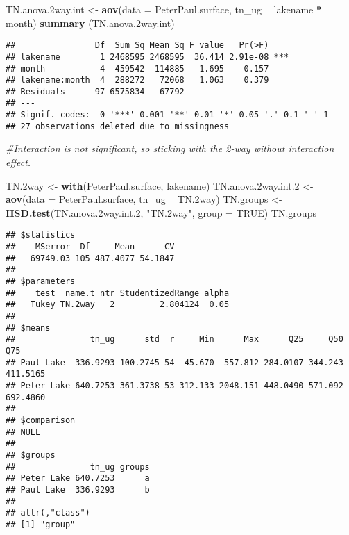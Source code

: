 \documentclass[]{article}
\newenvironment{Shaded}{\begin{snugshade}}{\end{snugshade}}
\newcommand{\CommentTok}[1]{\textcolor[rgb]{0.56,0.35,0.01}{\textit{#1}}}
\newcommand{\DataTypeTok}[1]{\textcolor[rgb]{0.13,0.29,0.53}{#1}}
\newcommand{\FloatTok}[1]{\textcolor[rgb]{0.00,0.00,0.81}{#1}}
\newcommand{\KeywordTok}[1]{\textcolor[rgb]{0.13,0.29,0.53}{\textbf{#1}}}
\newcommand{\NormalTok}[1]{#1}
\newcommand{\OperatorTok}[1]{\textcolor[rgb]{0.81,0.36,0.00}{\textbf{#1}}}
\newcommand{\OtherTok}[1]{\textcolor[rgb]{0.56,0.35,0.01}{#1}}
\newcommand{\StringTok}[1]{\textcolor[rgb]{0.31,0.60,0.02}{#1}}
\begin{document}
\begin{Shaded}
\begin{Highlighting}[]
\NormalTok{TN.anova}\FloatTok{.2}\NormalTok{way.int <-}\StringTok{ }\KeywordTok{aov}\NormalTok{(}\DataTypeTok{data =}\NormalTok{ PeterPaul.surface, tn_ug }\OperatorTok{~}\StringTok{ }\NormalTok{lakename }\OperatorTok{*}\StringTok{ }\NormalTok{month)}
\KeywordTok{summary}\NormalTok{ (TN.anova}\FloatTok{.2}\NormalTok{way.int)}
\end{Highlighting}
\end{Shaded}

\begin{verbatim}
##                Df  Sum Sq Mean Sq F value   Pr(>F)    
## lakename        1 2468595 2468595  36.414 2.91e-08 ***
## month           4  459542  114885   1.695    0.157    
## lakename:month  4  288272   72068   1.063    0.379    
## Residuals      97 6575834   67792                     
## ---
## Signif. codes:  0 '***' 0.001 '**' 0.01 '*' 0.05 '.' 0.1 ' ' 1
## 27 observations deleted due to missingness
\end{verbatim}

\begin{Shaded}
\begin{Highlighting}[]
\CommentTok{#Interaction is not significant, so sticking with the 2-way without interaction effect.}

\NormalTok{TN}\FloatTok{.2}\NormalTok{way <-}\StringTok{ }\KeywordTok{with}\NormalTok{(PeterPaul.surface, lakename)}
\NormalTok{TN.anova}\FloatTok{.2}\NormalTok{way.int}\FloatTok{.2}\NormalTok{ <-}\StringTok{ }\KeywordTok{aov}\NormalTok{(}\DataTypeTok{data =}\NormalTok{ PeterPaul.surface, tn_ug }\OperatorTok{~}\StringTok{ }\NormalTok{TN}\FloatTok{.2}\NormalTok{way)}
\NormalTok{TN.groups <-}\StringTok{ }\KeywordTok{HSD.test}\NormalTok{(TN.anova}\FloatTok{.2}\NormalTok{way.int}\FloatTok{.2}\NormalTok{, }\StringTok{"TN.2way"}\NormalTok{, }\DataTypeTok{group =} \OtherTok{TRUE}\NormalTok{)}
\NormalTok{TN.groups}
\end{Highlighting}
\end{Shaded}

\begin{verbatim}
## $statistics
##    MSerror  Df     Mean      CV
##   69749.03 105 487.4077 54.1847
## 
## $parameters
##    test  name.t ntr StudentizedRange alpha
##   Tukey TN.2way   2         2.804124  0.05
## 
## $means
##               tn_ug      std  r     Min      Max      Q25     Q50      Q75
## Paul Lake  336.9293 100.2745 54  45.670  557.812 284.0107 344.243 411.5165
## Peter Lake 640.7253 361.3738 53 312.133 2048.151 448.0490 571.092 692.4860
## 
## $comparison
## NULL
## 
## $groups
##               tn_ug groups
## Peter Lake 640.7253      a
## Paul Lake  336.9293      b
## 
## attr(,"class")
## [1] "group"
\end{verbatim}
\end{document}
